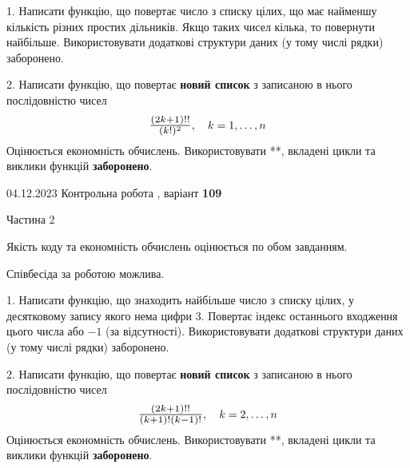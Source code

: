 \documentclass[12pt, ukrainian]{article}
\begin{document}
{{{{{{{{\begin {Large}
\vspace{5mm}

1. Написати функцію, що повертає число з списку цілих, що має найменшу кількість різних простих дільників. Якщо таких чисел кілька, то повернути найбільше. Використовувати додаткові структури даних (у тому числі рядки) заборонено.

\vspace{10mm}



2. 
Написати функцію, що повертає \textbf{новий список} з записаною в нього послідовністю чисел
$$\scalebox{1.2}{$\frac{(2k+1)!!}{(k!)^2}$}, \quad k=1,\ldots,n$$
Оцінюється економність обчислень. Використовувати **, вкладені цикли та виклики функцій \textbf{заборонено}.

\end{Large}\newpage




\begin {Huge}
{{04.12.2023 Контрольна робота , варіант  \No \textbf { 109 }\par}}

\begin{center}Частина 2
\end{center}
\vspace{10mm}
\end {Huge}

{
\begin {Large}
Якість коду та економність обчислень оцінюється по обом завданням.

Співбесіда за роботою можлива.

\vspace{5mm}

1. Написати функцію, що знаходить найбільше число з списку цілих, у десятковому запису якого нема цифри 3. Повертає індекс останнього входження цього числа або $-1$ (за відсутності). Використовувати додаткові структури даних (у тому числі рядки) заборонено.

\vspace{10mm}



2. 
Написати функцію, що повертає \textbf{новий список} з записаною в нього послідовністю чисел
$$\scalebox{1.2}{$\frac{(2k+1)!!}{(k+1)!(k-1)!}$}, \quad k=2,\ldots,n$$
Оцінюється економність обчислень. Використовувати **, вкладені цикли та виклики функцій \textbf{заборонено}.


\end{Large}}}}}}}}}}
\end{document}
